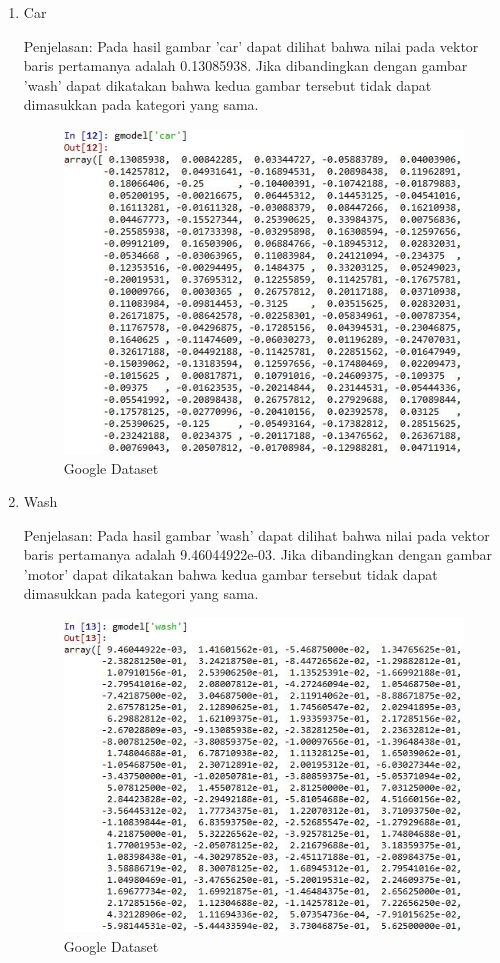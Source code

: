 \begin{enumerate}
\begin{enumerate}
\item Car

Penjelasan: Pada hasil gambar 'car' dapat dilihat bahwa nilai pada vektor baris pertamanya adalah 0.13085938. Jika dibandingkan dengan gambar 'wash' dapat dikatakan bahwa kedua gambar tersebut tidak dapat dimasukkan pada kategori yang sama.

\begin{figure}[H]
\centering
\includegraphics[scale=0.7]{figures/1174051/5/19car.jpg}
\caption{Google Dataset}
\label{Google Dataset}
\end{figure}

\item Wash

Penjelasan: Pada hasil gambar 'wash' dapat dilihat bahwa nilai pada vektor baris pertamanya adalah 9.46044922e-03. Jika dibandingkan dengan gambar 'motor' dapat dikatakan bahwa kedua gambar tersebut tidak dapat dimasukkan pada kategori yang sama.

\begin{figure}[H]
\centering
\includegraphics[scale=0.7]{figures/1174051/5/20wash.jpg}
\caption{Google Dataset}
\label{Google Dataset}
\end{figure}


\end{enumerate}
\end{enumerate}
